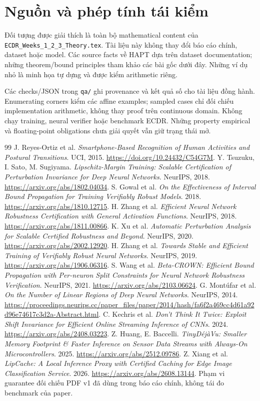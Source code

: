 \documentclass[11pt,a4paper]{article}
\newcommand{\code}[1]{{\small\ttfamily\nolinkurl{#1}}}
\theoremstyle{definition}
\begin{document}
\section{Nguồn và phép tính tái kiểm}
Đối tượng được giải thích là toàn bộ mathematical content của
\code{ECDR_Weeks_1_2_3_Theory.tex}. Tài liệu này không thay đổi báo cáo chính,
dataset hoặc model. Các source facts về HAPT dựa trên dataset documentation;
những theorem/bound principles tham khảo các bài gốc dưới đây. Những ví dụ
nhỏ là minh họa tự dựng và được kiểm arithmetic riêng.

Các checks/JSON trong \code{qa/} ghi provenance và kết quả số cho tài liệu
đồng hành. Enumerating corners kiểm các affine examples; sampled cases chỉ
đối chiếu implementation arithmetic, không thay proof trên continuous domain.
Không chạy training, neural verifier hoặc benchmark ECDR. Những property
empirical và floating-point obligations chưa giải quyết vẫn giữ trạng thái mở.

\begin{thebibliography}{99}
 J. Reyes-Ortiz et al. \emph{Smartphone-Based Recognition of
Human Activities and Postural Transitions}. UCI, 2015.
\url{https://doi.org/10.24432/C54G7M}.
 Y. Tsuzuku, I. Sato, M. Sugiyama. \emph{Lipschitz-Margin
Training: Scalable Certification of Perturbation Invariance for Deep Neural
Networks}. NeurIPS, 2018. \url{https://arxiv.org/abs/1802.04034}.
 S. Gowal et al. \emph{On the Effectiveness of Interval Bound
Propagation for Training Verifiably Robust Models}. 2018.
\url{https://arxiv.org/abs/1810.12715}.
 H. Zhang et al. \emph{Efficient Neural Network Robustness
Certification with General Activation Functions}. NeurIPS, 2018.
\url{https://arxiv.org/abs/1811.00866}.
 K. Xu et al. \emph{Automatic Perturbation Analysis for
Scalable Certified Robustness and Beyond}. NeurIPS, 2020.
\url{https://arxiv.org/abs/2002.12920}.
 H. Zhang et al. \emph{Towards Stable and Efficient
Training of Verifiably Robust Neural Networks}. NeurIPS, 2019.
\url{https://arxiv.org/abs/1906.06316}.
 S. Wang et al. \emph{Beta-CROWN: Efficient Bound
Propagation with Per-neuron Split Constraints for Neural Network Robustness
Verification}. NeurIPS, 2021. \url{https://arxiv.org/abs/2103.06624}.
 G. Mont\'ufar et al. \emph{On the Number of Linear
Regions of Deep Neural Networks}. NeurIPS, 2014.
\url{https://proceedings.neurips.cc/paper_files/paper/2014/hash/fa6f2a469cc4d61a92d96e74617c3d2a-Abstract.html}.
 C. Kechris et al. \emph{Don't Think It Twice: Exploit
Shift Invariance for Efficient Online Streaming Inference of CNNs}. 2024.
\url{https://arxiv.org/abs/2408.03223}.
 Z. Huang, E. Baccelli. \emph{TinyD\'ej\`aVu: Smaller Memory
Footprint \& Faster Inference on Sensor Data Streams with Always-On
Microcontrollers}. 2025. \url{https://arxiv.org/abs/2512.09786}.
 Z. Xiang et al. \emph{LipCache: A Local Inference Proxy
with Certified Caching for Edge Image Classification Service}. 2026.
\url{https://arxiv.org/abs/2608.13144}. Phạm vi guarantee đối chiếu PDF v1
đã dùng trong báo cáo chính, không tái đo benchmark của paper.
\end{thebibliography}
\end{document}
